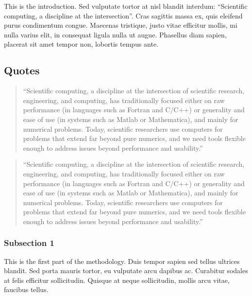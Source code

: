 This is the introduction. Sed vulputate tortor at nisl blandit
interdum: \enquote{Scientific computing, a discipline at the
intersection}\autocite[13]{Vaswani_AttentionAll_2017}. Cras sagittis massa
ex, quis eleifend purus condimentum congue. Maecenas tristique,
justo vitae efficitur mollis, mi nulla varius elit, in consequat
ligula nulla ut augue. Phasellus diam sapien, placerat sit amet
tempor non, lobortis tempus ante.

\hypertarget{quotes}{%
\subsection{Quotes}\label{quotes}}

\begin{quote}
\enquote{Scientific computing, a discipline at the intersection of
scientific research, engineering, and computing, has traditionally
focused either on raw performance (in languages such as Fortran and
C/C++) or generality and ease of use (in systems such as Matlab or
Mathematica), and mainly for numerical problems. Today, scientific
researchers use computers for problems that extend far beyond pure
numerics, and we need tools flexible enough to address issues beyond
performance and usability.}

\autocite[13]{Perez_PythonEcosystem_2011}
\end{quote}


\blockcquote{Perez_PythonEcosystem_2011}{\enquote{Scientific computing, a discipline at the intersection of scientific research, engineering, and computing, has traditionally focused either on raw performance (in languages such as Fortran and C/C++) or generality and ease of use (in systems such as Matlab or Mathematica), and mainly for numerical problems. Today, scientific researchers use computers for problems that extend far beyond pure numerics, and we need tools flexible enough to address issues beyond performance and usability.}}

\hypertarget{subsection-1}{%
\subsubsection{Subsection 1}\label{subsection-1}}

This is the first part of the methodology. Duis tempor sapien sed
tellus ultrices blandit. Sed porta mauris tortor, eu vulputate arcu
dapibus ac. Curabitur sodales at felis efficitur sollicitudin.
Quisque at neque sollicitudin, mollis arcu vitae, faucibus tellus.

